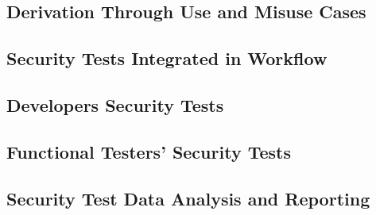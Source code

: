 		\subsection{Derivation Through Use and Misuse Cases}

		\subsection{Security Tests Integrated in Workflow}

		\subsection{Developers Security Tests}

		\subsection{Functional Testers' Security Tests}

		\subsection{Security Test Data Analysis and Reporting}


